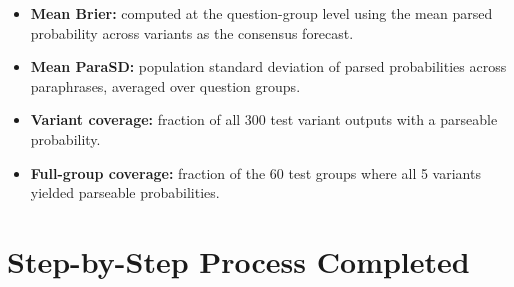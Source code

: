 \documentclass[11pt]{article}
\begin{document}
\begin{itemize}[leftmargin=*]
  \item \textbf{Mean Brier:} computed at the question-group level using the mean parsed probability across variants as the consensus forecast.
  \item \textbf{Mean ParaSD:} population standard deviation of parsed probabilities across paraphrases, averaged over question groups.
  \item \textbf{Variant coverage:} fraction of all 300 test variant outputs with a parseable probability.
  \item \textbf{Full-group coverage:} fraction of the 60 test groups where all 5 variants yielded parseable probabilities.
\end{itemize}

\section*{Step-by-Step Process Completed}
\end{document}
